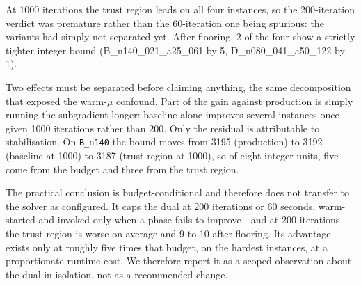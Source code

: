 At 1000 iterations the trust region leads on all four instances, so the 200-iteration verdict was premature rather than the 60-iteration one being spurious: the variants had simply not separated yet. After flooring, 2 of the four show a strictly tighter integer bound (B\_n140\_021\_a25\_061 by 5, D\_n080\_041\_a50\_122 by 1).

Two effects must be separated before claiming anything, the same decomposition that exposed the warm-$\mu$ confound. Part of the gain against production is simply running the subgradient longer: baseline alone improves several instances once given 1000 iterations rather than 200. Only the residual is attributable to stabilisation. On \texttt{B\_n140} the bound moves from 3195 (production) to 3192 (baseline at 1000) to 3187 (trust region at 1000), so of eight integer units, five come from the budget and three from the trust region.

The practical conclusion is budget-conditional and therefore does not transfer to the solver as configured. It caps the dual at 200 iterations or 60 seconds, warm-started and invoked only when a phase fails to improve---and at 200 iterations the trust region is worse on average and 9-to-10 after flooring. Its advantage exists only at roughly five times that budget, on the hardest instances, at a proportionate runtime cost. We therefore report it as a scoped observation about the dual in isolation, not as a recommended change.
